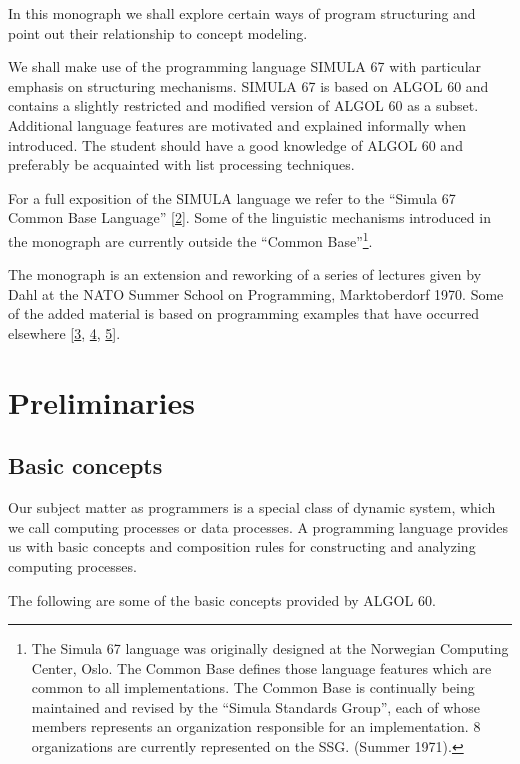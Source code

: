 \documentclass[twoside,11pt]{book}
\begin{document}
In this monograph we shall explore certain ways of program structuring and point out their relationship to concept modeling.

We shall make use of the programming language SIMULA 67 with particular emphasis on structuring mechanisms. SIMULA 67 is based on ALGOL 60 and contains a slightly restricted and modified version of ALGOL 60 as a subset. Additional language features are motivated and explained informally when introduced. The student should have a good knowledge of ALGOL 60 and preferably be acquainted with list processing techniques.

For a full exposition of the SIMULA language we refer to the ``Simula 67 Common Base Language'' [\hyperref[ref:2]{2}]. Some of the linguistic mechanisms introduced in the monograph are currently outside the ``Common Base''\footnote{The Simula 67 language was originally designed at the Norwegian Computing Center, Oslo. The Common Base defines those language features which are common to all implementations. The Common Base is continually being maintained and revised by the ``Simula Standards Group'', each of whose members represents an organization responsible for an implementation. 8 organizations are currently represented on the SSG. (Summer 1971).}.

The monograph is an extension and reworking of a series of lectures given by Dahl at the NATO Summer School on Programming, Marktoberdorf 1970. Some of the added material is based on programming examples that have occurred elsewhere [\hyperref[ref:3]{3}, \hyperref[ref:4]{4}, \hyperref[ref:5]{5}].

\section{Preliminaries}

\subsection{Basic concepts}

Our subject matter as programmers is a special class of dynamic system, which we call computing processes or data processes. A programming language provides us with basic concepts and composition rules for constructing and analyzing computing processes.

The following are some of the basic concepts provided by ALGOL 60.
\end{document}
